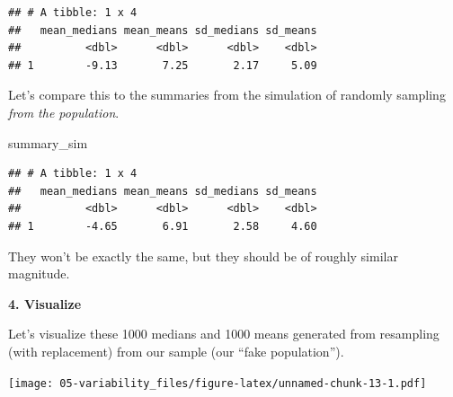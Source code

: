 \documentclass[
]{book}
\newenvironment{Shaded}{\begin{snugshade}}{\end{snugshade}}
\newcommand{\CommentTok}[1]{\textcolor[rgb]{0.56,0.35,0.01}{\textit{#1}}}
\newcommand{\DataTypeTok}[1]{\textcolor[rgb]{0.13,0.29,0.53}{#1}}
\newcommand{\DecValTok}[1]{\textcolor[rgb]{0.00,0.00,0.81}{#1}}
\newcommand{\KeywordTok}[1]{\textcolor[rgb]{0.13,0.29,0.53}{\textbf{#1}}}
\newcommand{\NormalTok}[1]{#1}
\newcommand{\OperatorTok}[1]{\textcolor[rgb]{0.81,0.36,0.00}{\textbf{#1}}}
\newcommand{\StringTok}[1]{\textcolor[rgb]{0.31,0.60,0.02}{#1}}
\begin{document}
\begin{verbatim}
## # A tibble: 1 x 4
##   mean_medians mean_means sd_medians sd_means
##          <dbl>      <dbl>      <dbl>    <dbl>
## 1        -9.13       7.25       2.17     5.09
\end{verbatim}

Let's compare this to the summaries from the simulation of randomly sampling \emph{from the population}.

\begin{Shaded}
\begin{Highlighting}[]
\NormalTok{summary_sim}
\end{Highlighting}
\end{Shaded}

\begin{verbatim}
## # A tibble: 1 x 4
##   mean_medians mean_means sd_medians sd_means
##          <dbl>      <dbl>      <dbl>    <dbl>
## 1        -4.65       6.91       2.58     4.60
\end{verbatim}

They won't be exactly the same, but they should be of roughly similar magnitude.

\textbf{4. Visualize}

Let's visualize these 1000 medians and 1000 means generated from resampling (with replacement) from our sample (our ``fake population'').

\begin{Shaded}
\end{Shaded}

\texttt{[image: 05-variability\_files/figure-latex/unnamed-chunk-13-1.pdf]}
\end{document}
